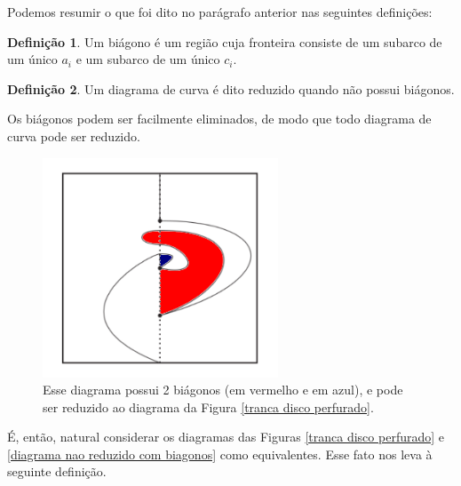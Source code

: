 \documentclass[a4paper,portuguese,11pt,twoside, leqno]{book}
\theoremstyle{definition}
\newtheorem{deff}{Definição}[section]
\begin{document}
	\par\vspace{0.3cm} Podemos resumir o que foi dito no parágrafo anterior nas seguintes definições:
	\begin{deff}
		\label{def biagono}
		Um biágono é um região cuja fronteira consiste de um subarco de um único $a_i$ e um subarco de um único $c_i$.
	\end{deff}
	\begin{deff}
		\label{def reducao}
		Um diagrama de curva é dito reduzido quando não possui biágonos.
	\end{deff}
	\par\vspace{0.3cm} Os biágonos podem ser facilmente eliminados, de modo que todo diagrama de curva pode ser reduzido. 
	
	\begin{figure}[H]
		\begin{center}
			\includegraphics[width=7cm]{Images/biagonos.png}
		\end{center}\caption{Esse diagrama possui 2 biágonos (em vermelho e em azul), e pode ser reduzido ao diagrama da Figura \eqref{tranca disco perfurado}.}
		\label{diagrama nao reduzido com biagonos}
	\end{figure}
	\par\vspace{0.3cm} É, então, natural considerar os diagramas das Figuras \eqref{tranca disco perfurado} e \eqref{diagrama nao reduzido com biagonos} como equivalentes. Esse fato nos leva à seguinte definição.
	
\end{document}
